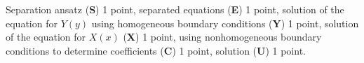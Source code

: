 \begin{bewertung}
Separation ansatz ({\bf S}) 1 point,
separated equations ({\bf E}) 1 point,
solution of the equation for $Y(y)$ using homogeneous boundary conditions
({\bf Y}) 1 point,
solution of the equation for $X(x)$ ({\bf X}) 1 point,
using nonhomogeneous boundary conditions to determine coefficients ({\bf C})
1 point,
solution ({\bf U}) 1 point.
\end{bewertung}





